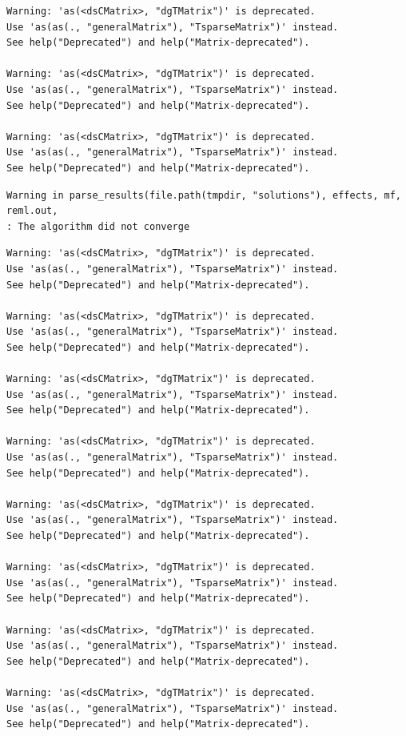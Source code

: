 \documentclass[
]{book}
\begin{document}
\begin{verbatim}
Warning: 'as(<dsCMatrix>, "dgTMatrix")' is deprecated.
Use 'as(as(., "generalMatrix"), "TsparseMatrix")' instead.
See help("Deprecated") and help("Matrix-deprecated").

Warning: 'as(<dsCMatrix>, "dgTMatrix")' is deprecated.
Use 'as(as(., "generalMatrix"), "TsparseMatrix")' instead.
See help("Deprecated") and help("Matrix-deprecated").

Warning: 'as(<dsCMatrix>, "dgTMatrix")' is deprecated.
Use 'as(as(., "generalMatrix"), "TsparseMatrix")' instead.
See help("Deprecated") and help("Matrix-deprecated").
\end{verbatim}

\begin{verbatim}
Warning in parse_results(file.path(tmpdir, "solutions"), effects, mf, reml.out,
: The algorithm did not converge
\end{verbatim}

\begin{verbatim}
Warning: 'as(<dsCMatrix>, "dgTMatrix")' is deprecated.
Use 'as(as(., "generalMatrix"), "TsparseMatrix")' instead.
See help("Deprecated") and help("Matrix-deprecated").

Warning: 'as(<dsCMatrix>, "dgTMatrix")' is deprecated.
Use 'as(as(., "generalMatrix"), "TsparseMatrix")' instead.
See help("Deprecated") and help("Matrix-deprecated").

Warning: 'as(<dsCMatrix>, "dgTMatrix")' is deprecated.
Use 'as(as(., "generalMatrix"), "TsparseMatrix")' instead.
See help("Deprecated") and help("Matrix-deprecated").

Warning: 'as(<dsCMatrix>, "dgTMatrix")' is deprecated.
Use 'as(as(., "generalMatrix"), "TsparseMatrix")' instead.
See help("Deprecated") and help("Matrix-deprecated").

Warning: 'as(<dsCMatrix>, "dgTMatrix")' is deprecated.
Use 'as(as(., "generalMatrix"), "TsparseMatrix")' instead.
See help("Deprecated") and help("Matrix-deprecated").

Warning: 'as(<dsCMatrix>, "dgTMatrix")' is deprecated.
Use 'as(as(., "generalMatrix"), "TsparseMatrix")' instead.
See help("Deprecated") and help("Matrix-deprecated").

Warning: 'as(<dsCMatrix>, "dgTMatrix")' is deprecated.
Use 'as(as(., "generalMatrix"), "TsparseMatrix")' instead.
See help("Deprecated") and help("Matrix-deprecated").

Warning: 'as(<dsCMatrix>, "dgTMatrix")' is deprecated.
Use 'as(as(., "generalMatrix"), "TsparseMatrix")' instead.
See help("Deprecated") and help("Matrix-deprecated").
\end{verbatim}
\end{document}
